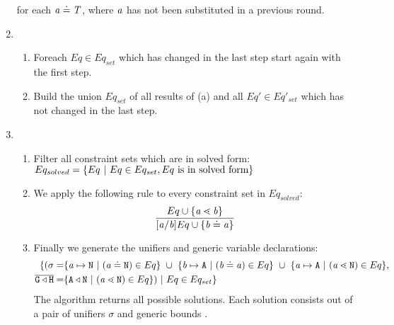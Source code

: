 \begin{enumerate}
      for each $\mathit{ a } \doteq \mathit{T}$, where $\mathit{ a }$ has not been substituted in a previous round.

\item 
    \begin{enumerate}
    \item Foreach $Eq \in Eq_{set}$ which has changed in the last step
      start again with the first step.
    \item Build the union $Eq_{set}$ of all results of (a) and all $Eq' \in
      Eq'_{set}$ which has not changed in the last step.
    \end{enumerate}
\item
\begin{enumerate}
  \item Filter all constraint sets which are in solved
  form:\\
$Eq_{solved} = \{  Eq \ | \ Eq \in Eq_{set}, Eq \ \text{is in solved form} \}$
\item We apply the following rule to every constraint set in $Eq_{solved}$:
\begin{align*}
\ddfrac{
  Eq \cup \set{ \tv{a} \lessdot \tv{b} } %
}{
  [\tv{a}/\tv{b}]Eq \cup \set{ \tv{b} \doteq \tv{a} }
}
\end{align*}
\item Finally we generate the unifiers and generic variable declarations:
\begin{align*}
  \set{ 
    (\sigma = &
    \set{\tv{a} \mapsto \type{N} \ | \ (\tv{a} \doteq \type{N}) \in Eq} \ \cup \  \set{\tv{b} \mapsto \type{A} \ | \ (\tv{b} \doteq \tv{a}) \in Eq} \ \cup \ 
    \set{\tv{a} \mapsto \type{A} \ | \ (\tv{a} \lessdot \type{N}) \in Eq }, \\
   \unifyGenerics{} = &
  \set{\type{A} \triangleleft \type{N} \ | \ (\tv{a} \lessdot \type{N}) \in Eq}) 
   \ | \ Eq \in Eq_{set}  }
\end{align*}
The \unify{} algorithm returns all possible solutions.
Each solution consists out of a pair of unifiers $\sigma$ and generic bounds \unifyGenerics{}.
\end{enumerate}
\end{enumerate}

